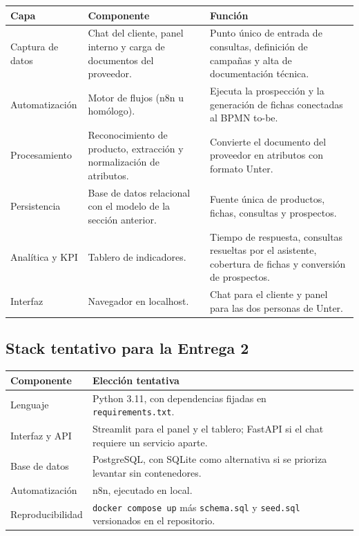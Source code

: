 \documentclass{article}
\begin{document}
\begin{table}[H]
\centering
\small
\begin{tabularx}{\textwidth}{lLL}
\toprule
\textbf{Capa} & \textbf{Componente} & \textbf{Función} \\
\midrule
Captura de datos & Chat del cliente, panel interno y carga de documentos del proveedor. & Punto único de entrada de consultas, definición de campañas y alta de documentación técnica. \\
\addlinespace
Automatización & Motor de flujos (n8n u homólogo). & Ejecuta la prospección y la generación de fichas conectadas al BPMN to-be. \\
\addlinespace
Procesamiento & Reconocimiento de producto, extracción y normalización de atributos. & Convierte el documento del proveedor en atributos con formato Unter. \\
\addlinespace
Persistencia & Base de datos relacional con el modelo de la sección anterior. & Fuente única de productos, fichas, consultas y prospectos. \\
\addlinespace
Analítica y KPI & Tablero de indicadores. & Tiempo de respuesta, consultas resueltas por el asistente, cobertura de fichas y conversión de prospectos. \\
\addlinespace
Interfaz & Navegador en localhost. & Chat para el cliente y panel para las dos personas de Unter. \\
\bottomrule
\end{tabularx}
\end{table}

\subsection{Stack tentativo para la Entrega 2}

\begin{table}[H]
\centering
\small
\begin{tabularx}{\textwidth}{lL}
\toprule
\textbf{Componente} & \textbf{Elección tentativa} \\
\midrule
Lenguaje & Python 3.11, con dependencias fijadas en \texttt{requirements.txt}. \\
Interfaz y API & Streamlit para el panel y el tablero; FastAPI si el chat requiere un servicio aparte. \\
Base de datos & PostgreSQL, con SQLite como alternativa si se prioriza levantar sin contenedores. \\
Automatización & n8n, ejecutado en local. \\
Reproducibilidad & \texttt{docker compose up} más \texttt{schema.sql} y \texttt{seed.sql} versionados en el repositorio. \\
\bottomrule
\end{tabularx}
\end{table}
\end{document}
